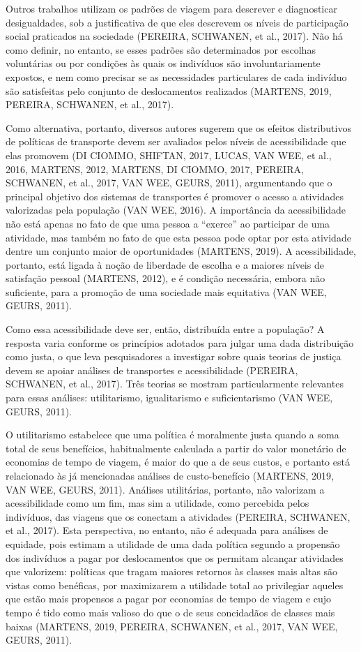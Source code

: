\documentclass[msc,numbers]{coppe}
\begin{document}
  Outros trabalhos utilizam os padrões de viagem para descrever e diagnosticar desigualdades, sob a justificativa de que eles descrevem os níveis de participação social praticados na sociedade (PEREIRA, SCHWANEN, et al., 2017). Não há como definir, no entanto, se esses padrões são determinados por escolhas voluntárias ou por condições às quais os indivíduos são involuntariamente expostos, e nem como precisar se as necessidades particulares de cada indivíduo são satisfeitas pelo conjunto de deslocamentos realizados (MARTENS, 2019, PEREIRA, SCHWANEN, et al., 2017).

  Como alternativa, portanto, diversos autores sugerem que os efeitos distributivos de políticas de transporte devem ser avaliados pelos níveis de acessibilidade que elas promovem (DI CIOMMO, SHIFTAN, 2017, LUCAS, VAN WEE, et al., 2016, MARTENS, 2012, MARTENS, DI CIOMMO, 2017, PEREIRA, SCHWANEN, et al., 2017, VAN WEE, GEURS, 2011), argumentando que o principal objetivo dos sistemas de transportes é promover o acesso a atividades valorizadas pela população (VAN WEE, 2016). A importância da acessibilidade não está apenas no fato de que uma pessoa a ``exerce'' ao participar de uma atividade, mas também no fato de que esta pessoa pode optar por esta atividade dentre um conjunto maior de oportunidades (MARTENS, 2019). A acessibilidade, portanto, está ligada à noção de liberdade de escolha e a maiores níveis de satisfação pessoal (MARTENS, 2012), e é condição necessária, embora não suficiente, para a promoção de uma sociedade mais equitativa (VAN WEE, GEURS, 2011).

  Como essa acessibilidade deve ser, então, distribuída entre a população? A resposta varia conforme os princípios adotados para julgar uma dada distribuição como justa, o que leva pesquisadores a investigar sobre quais teorias de justiça devem se apoiar análises de transportes e acessibilidade (PEREIRA, SCHWANEN, et al., 2017). Três teorias se mostram particularmente relevantes para essas análises: utilitarismo, igualitarismo e suficientarismo (VAN WEE, GEURS, 2011).

  O utilitarismo estabelece que uma política é moralmente justa quando a soma total de seus benefícios, habitualmente calculada a partir do valor monetário de economias de tempo de viagem, é maior do que a de seus custos, e portanto está relacionado às já mencionadas análises de custo-benefício (MARTENS, 2019, VAN WEE, GEURS, 2011). Análises utilitárias, portanto, não valorizam a acessibilidade como um fim, mas sim a utilidade, como percebida pelos indivíduos, das viagens que os conectam a atividades (PEREIRA, SCHWANEN, et al., 2017). Esta perspectiva, no entanto, não é adequada para análises de equidade, pois estimam a utilidade de uma dada política segundo a propensão dos indivíduos a pagar por deslocamentos que os permitam alcançar atividades que valorizem: políticas que tragam maiores retornos às classes mais altas são vistas como benéficas, por maximizarem a utilidade total ao privilegiar aqueles que estão mais propensos a pagar por economias de tempo de viagem e cujo tempo é tido como mais valioso do que o de seus concidadãos de classes mais baixas (MARTENS, 2019, PEREIRA, SCHWANEN, et al., 2017, VAN WEE, GEURS, 2011).
\end{document}
